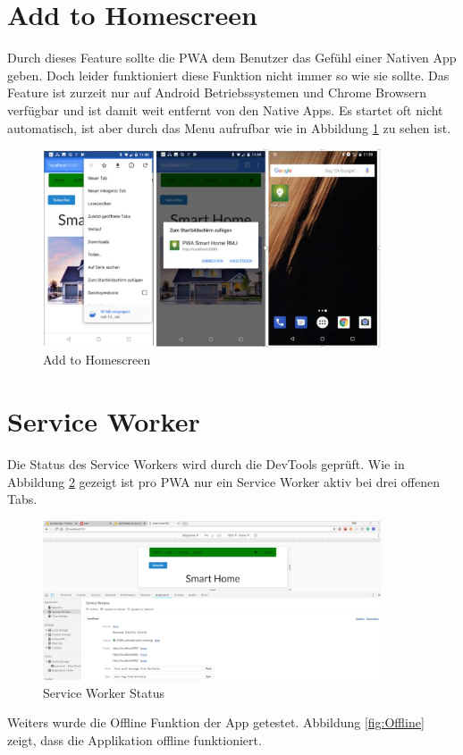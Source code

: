 \section{Add to Homescreen}
Durch dieses Feature sollte die \acs{PWA} dem Benutzer das Gefühl einer Nativen App geben. Doch leider funktioniert diese Funktion nicht immer so wie sie sollte.
Das Feature ist zurzeit nur auf Android Betriebssystemen und Chrome Browsern verfügbar und ist damit weit entfernt von den Native Apps. Es startet oft nicht automatisch, ist aber durch das Menu aufrufbar wie in Abbildung \ref{fig:ADDHome} zu sehen ist.

\begin{figure}[h]
	\centering
	\includegraphics[width=10cm]{BilderAllgemein/Test/ADDHome}\medskip
	\caption{Add to Homescreen}
	\label{fig:ADDHome}
\end{figure}
\newpage

\section{Service Worker}
Die Status des Service Workers wird durch die DevTools geprüft.
Wie in Abbildung \ref{fig:SWTest} gezeigt ist pro \acs{PWA} nur ein Service Worker aktiv bei drei offenen Tabs. 

\begin{figure}[h]
	\centering
	\includegraphics[width=10cm]{BilderAllgemein/Test/SW}\medskip
	\caption{Service Worker Status}
	\label{fig:SWTest}
\end{figure}
Weiters wurde die Offline Funktion der App getestet.
Abbildung \ref{fig:Offline} zeigt, dass die Applikation offline funktioniert.

